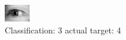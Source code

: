 \begin{figure}[h!]
\begin{center}
\includegraphics[width=0.60\columnwidth]{figures/ID3164_class_3_target_4.png}
\end{center}
\caption{ Classification: 3 actual target: 4}
\label{fig:ID3164_class_3_target_4}
\end{figure}
